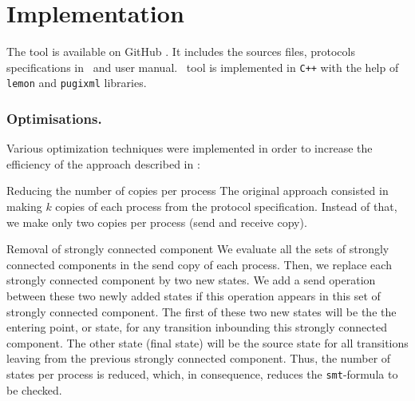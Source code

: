\section{Implementation}
\label{sec:optim}

The tool is available on GitHub \cite{github.MPass}.
It includes the sources files, protocols specifications in \xml\ and user manual.
%
\MPass\ tool is implemented in \texttt{C++} with the help of {\tt lemon} and {\tt pugixml} libraries.

\subsubsection{Optimisations.}

Various optimization techniques were implemented in order to increase the efficiency of the approach described in  \cite{AAC13}:

\begin{description}
\item{Reducing the number of copies per process}
The original approach consisted in making $k$ copies of each process from the protocol specification.
Instead of that, we make only two copies per process (send and receive copy).
%
\item{Removal of strongly connected component}
We evaluate all the sets of strongly connected components in the send copy of each process. 
Then, we replace each strongly connected component by two new states.
We add a send operation between these two newly added states if this operation appears in this set of strongly connected component.
The first of these two new states will be the the entering point, or state, for any transition inbounding this strongly connected component.
The other state (final state) will be  the source state for all transitions leaving from the previous strongly connected component.
Thus, the number of states per process is reduced, which, in consequence, reduces the \texttt{smt}-formula to be checked.
\end{description}
